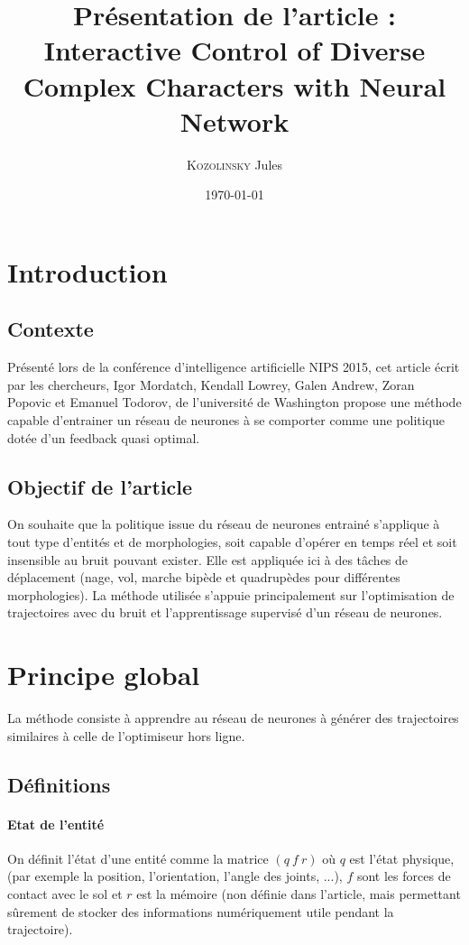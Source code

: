 \documentclass[a4paper,10pt]{article}
\title{{\huge Présentation de l'article :} \\
Interactive Control of Diverse Complex Characters with Neural Network \cite{NIPS2015_5764}}
\author{\textsc{Kozolinsky} Jules}
\date\today
\begin{document}
\maketitle
\tableofcontents

\section{Introduction}
\subsection{Contexte}
  Présenté lors de la conférence d'intelligence artificielle NIPS 2015, cet article écrit par les chercheurs, Igor Mordatch, Kendall Lowrey, Galen Andrew, Zoran Popovic et Emanuel Todorov, de l'université de Washington propose une méthode capable d'entrainer un réseau de neurones à se comporter comme une politique dotée d'un feedback quasi optimal. 

\subsection{Objectif de l'article}
  On souhaite que la politique issue du réseau de neurones entrainé s'applique à tout type d'entités et de morphologies, soit capable d'opérer en temps réel et soit insensible au bruit pouvant exister. Elle est appliquée ici à des tâches de déplacement (nage, vol, marche bipède et quadrupèdes pour différentes morphologies). La méthode utilisée s'appuie principalement sur l'optimisation de trajectoires avec du bruit et l'apprentissage supervisé d'un réseau de neurones. 


\section{Principe global}
La méthode consiste à apprendre au réseau de neurones à générer des trajectoires similaires à celle de l'optimiseur hors ligne.
\subsection{Définitions}
\paragraph{Etat de l'entité} On définit l'état d'une entité comme la matrice $(q~f~r)$ où $q$ est l'état physique, (par exemple la position, l'orientation, l'angle des joints, ...), $f$ sont les forces de contact avec le sol et $r$ est la mémoire (non définie dans l'article, mais permettant sûrement de stocker des informations numériquement utile pendant la trajectoire).
\end{document}
